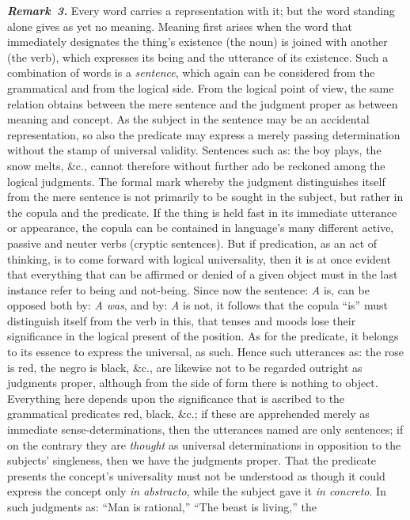\documentclass[12pt]{book}
\newcommand{\anm}[1]{\emph{\textbf{Remark~#1.}}}
\begin{document}
\anm{3} Every word carries a representation with it; but the word standing
alone gives as yet no meaning. Meaning first arises when the word that
immediately designates the thing's existence (the noun) is joined with
another (the verb), which expresses its being and the utterance of its
existence. Such a combination of words is a \emph{sentence}, which again can
be considered from the grammatical and from the logical side. From the
logical point of view, the same relation obtains between the mere sentence
and the judgment proper as between meaning and concept. As the subject in
the sentence may be an accidental representation, so also the predicate may
express a merely passing determination without the stamp of universal
validity. Sentences such as: the boy plays, the snow melts, \&c., cannot
therefore without further ado be reckoned among the logical judgments. The
formal mark whereby the judgment distinguishes itself from the mere sentence
is not primarily to be sought in the subject, but rather in the copula and
the predicate. If the thing is held fast in its immediate utterance or
appearance, the copula can be contained in language's many different active,
passive and neuter verbs (cryptic sentences). But if predication, as an act
of thinking, is to come forward with logical universality, then it is at
once evident that everything that can be affirmed or denied of a given
object must in the last instance refer to being and not-being. Since now the
sentence: \textit{A} is, can be opposed both by: \textit{A} \emph{was}, and
by: \textit{A} is not, it follows that the copula ``is'' must distinguish
itself from the verb in this, that tenses and moods lose their significance
in the logical present of the position. As for the predicate, it belongs to
its essence to express the universal, as such. Hence such utterances as: the
rose is red, the negro is black, \&c., are likewise not to be regarded
outright as judgments proper, although from the side of form there is
nothing to object. Everything here depends upon the significance that is
ascribed to the grammatical predicates red, black, \&c.; if these are
apprehended merely as immediate sense-determinations, then the utterances
named are only sentences; if on the contrary they are \emph{thought} as
universal determinations in opposition to the subjects' singleness, then we
have the judgments proper. That the predicate presents the concept's
universality must not be understood as though it could express the concept
only \textit{in abstracto}, while the subject gave it \textit{in concreto}.
In such judgments as: ``Man is rational,'' ``The beast is living,'' the
\end{document}
